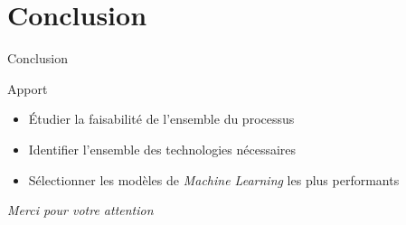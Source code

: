 \documentclass[10pt,sans,usenames,dvipsnames,english,compress]{beamer}
\begin{document}
\section{Conclusion}
\begin{frame}{Conclusion}
	\begin{exampleblock}{Apport}
		\begin{itemize}
		\item Étudier la faisabilité de l’ensemble du processus
		\item Identifier l’ensemble des technologies nécessaires
		\item Sélectionner les modèles de \emph{Machine Learning} les plus performants
		\end{itemize}
	\end{exampleblock}

\end{frame}

\begin{frame}{}
  \centering \huge
  \emph{Merci pour votre attention}
\end{frame}
\end{document}
